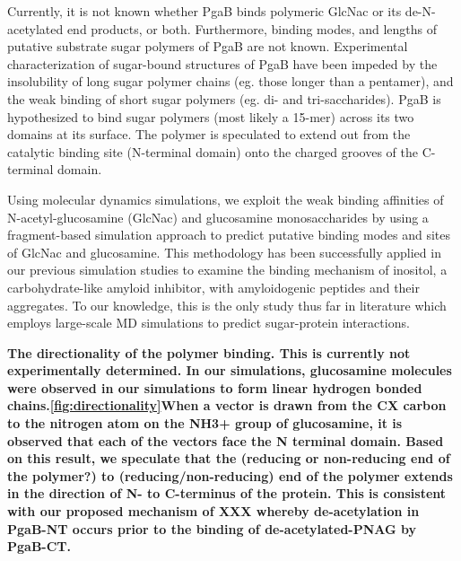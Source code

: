 Currently, it is not known whether PgaB binds polymeric GlcNac or its de-N-acetylated end products, or both. Furthermore, binding modes, and lengths of putative substrate sugar polymers of PgaB are not known. Experimental characterization of sugar-bound structures of PgaB have been impeded by the insolubility of long sugar polymer chains (eg. those longer than a pentamer), and the weak binding of short sugar polymers (eg. di- and tri-saccharides). PgaB is hypothesized to bind sugar polymers (most likely a 15-mer) across its two domains at its surface. The polymer is speculated to extend out from the catalytic binding site (N-terminal domain) onto the charged grooves of the C-terminal domain.

Using molecular dynamics simulations, we exploit the weak binding affinities of N-acetyl-glucosamine (GlcNac) and glucosamine monosaccharides by using a fragment-based simulation approach to predict putative binding modes and sites of GlcNac and glucosamine. This methodology has been successfully applied in our previous simulation studies to examine the binding mechanism of inositol, a carbohydrate-like amyloid inhibitor, with amyloidogenic peptides and their aggregates. To our knowledge, this is the only study thus far in literature which employs large-scale MD simulations to predict sugar-protein interactions.

\textbf{The directionality of the polymer binding.  This is currently not experimentally determined. In our simulations, glucosamine molecules were observed in our simulations to form linear hydrogen bonded chains.\ref{fig:directionality}When a vector is drawn from the CX carbon to the nitrogen atom on the NH3+ group of glucosamine, it is observed that each of the vectors face the N terminal domain. Based on this result, we speculate that the (reducing or non-reducing end of the polymer?) to (reducing/non-reducing) end of the polymer extends in the direction of N- to C-terminus of the protein.  This is consistent with our proposed mechanism of XXX whereby de-acetylation in PgaB-NT occurs prior to the binding of de-acetylated-PNAG by PgaB-CT.}

